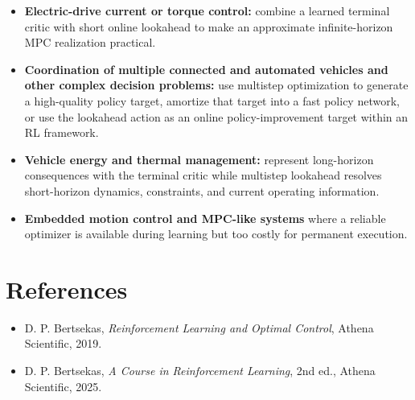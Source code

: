 \documentclass[a4paper]{article}
\begin{document}
\begin{itemize}
  \item \textbf{Electric-drive current or torque control:} combine a learned terminal
  critic with short online lookahead to make an approximate infinite-horizon
  MPC realization practical.
  \item \textbf{Coordination of multiple connected and automated vehicles and other
  complex decision problems:} use multistep optimization to generate a
  high-quality policy target, amortize that target into a fast policy network,
  or use the lookahead action as an online policy-improvement target within an
  RL framework.
  \item \textbf{Vehicle energy and thermal management:} represent long-horizon
  consequences with the terminal critic while multistep lookahead resolves
  short-horizon dynamics, constraints, and current operating information.
  \item \textbf{Embedded motion control and MPC-like systems} where a reliable optimizer
  is available during learning but too costly for permanent execution.
\end{itemize}

\section{References}

\begin{itemize}
  \item D. P. Bertsekas, \textit{Reinforcement Learning and Optimal Control}, Athena
  Scientific, 2019.
  \item D. P. Bertsekas, \textit{A Course in Reinforcement Learning}, 2nd ed., Athena
  Scientific, 2025.
\end{itemize}





\end{document}
